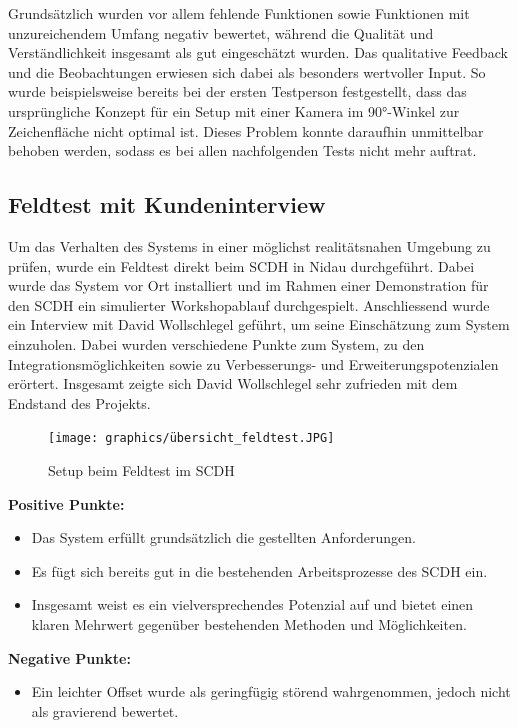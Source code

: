 Grundsätzlich wurden vor allem fehlende Funktionen sowie Funktionen mit unzureichendem Umfang negativ bewertet, während die Qualität und Verständlichkeit insgesamt als gut eingeschätzt wurden. Das qualitative Feedback und die Beobachtungen erwiesen sich dabei als besonders wertvoller Input. So wurde beispielsweise bereits bei der ersten Testperson festgestellt, dass das ursprüngliche Konzept für ein Setup mit einer Kamera im 90°-Winkel zur Zeichenfläche nicht optimal ist. Dieses Problem konnte daraufhin unmittelbar behoben werden, sodass es bei allen nachfolgenden Tests nicht mehr auftrat.
\clearpage

\subsection{Feldtest mit Kundeninterview}

Um das Verhalten des Systems in einer möglichst realitätsnahen Umgebung zu prüfen, wurde ein Feldtest direkt beim SCDH in Nidau durchgeführt. 
Dabei wurde das System vor Ort installiert und im Rahmen einer Demonstration für den SCDH ein simulierter Workshopablauf durchgespielt. 
Anschliessend wurde ein Interview mit David Wollschlegel geführt, um seine Einschätzung zum System einzuholen. 
Dabei wurden verschiedene Punkte zum System, zu den Integrationsmöglichkeiten sowie zu Verbesserungs- und Erweiterungspotenzialen erörtert. 
Insgesamt zeigte sich David Wollschlegel sehr zufrieden mit dem Endstand des Projekts.


\begin{figure}[H]
    \centering
    \texttt{[image: graphics/übersicht\_feldtest.JPG]}
    \caption{Setup beim Feldtest im SCDH}
    \label{fig:placeholder}
\end{figure}

\textbf{Positive Punkte:}
\begin{itemize}
    \item Das System erfüllt grundsätzlich die gestellten Anforderungen.
    \item Es fügt sich bereits gut in die bestehenden Arbeitsprozesse des SCDH ein.
    \item Insgesamt weist es ein vielversprechendes Potenzial auf und bietet einen klaren Mehrwert gegenüber bestehenden Methoden und Möglichkeiten.
\end{itemize}

\textbf{Negative Punkte:}
\begin{itemize}
    \item Ein leichter Offset wurde als geringfügig störend wahrgenommen, jedoch nicht als gravierend bewertet.
\end{itemize}

